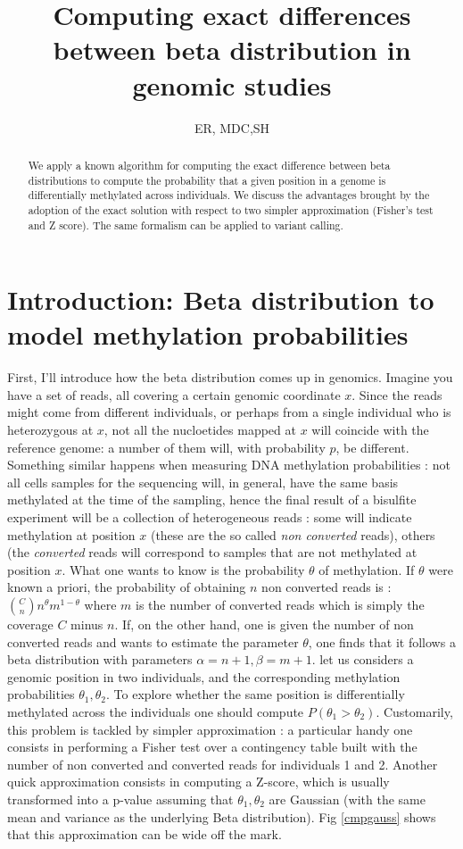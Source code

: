 \documentclass{amsart}
\title{Computing exact differences between beta distribution in genomic studies}
\author{ER, MDC,SH}
\begin{document}
\begin{abstract}
We apply a known algorithm for computing the exact difference between beta distributions
to compute the probability that a given position in a genome is differentially methylated across
individuals. We discuss the advantages brought by the adoption of the exact solution
with respect to two simpler approximation (Fisher's test and Z score).
The same formalism can be applied to variant calling.
\end{abstract}
\maketitle

\section{Introduction: Beta distribution to model methylation probabilities}
First, I'll introduce how the beta distribution comes up in genomics.
Imagine you have a set of reads, all covering a certain genomic coordinate $x$. Since the reads might come from different individuals, or perhaps from a single individual who is heterozygous at $x$, not all the nucloetides mapped at $x$ will coincide with the reference genome: a number of them will, with probability $p$, be different. 
Something similar happens when measuring DNA methylation probabilities : not all cells samples for the sequencing will, in general,  have the same basis methylated at the time of the sampling, hence the final result of a bisulfite experiment will be a collection of heterogeneous reads : some will indicate methylation at position $x$ (these are the so called {\em non converted} reads), others (the {\em converted} reads will correspond to samples that are not methylated at position $x$. What one wants to know is the probability $\theta$ of methylation. If $\theta$ were known a priori, the probability of obtaining $n$ non converted reads is :
${C \choose n}n^\theta m^{1-\theta}$
where $m$ is the number of converted reads which is simply the coverage $C$ minus $n$.
If, on the other hand, one is given the number of non converted reads and wants to
estimate the parameter $\theta$, one finds that it follows a beta distribution with parameters $\alpha=n+1,\beta=m+1$.
let us considers a genomic position in two individuals, and the corresponding methylation probabilities $\theta_1,\theta_2$. To explore whether the same position is differentially methylated across the individuals one
should compute $P(\theta_1>\theta_2)$. Customarily, this problem is tackled by simpler approximation : a particular handy one consists in performing a Fisher test over a contingency table built with the number of non converted and converted reads for individuals 1 and 2. Another quick approximation consists in computing a Z-score, which is usually transformed into a p-value assuming that $\theta_1,\theta_2$ are Gaussian (with the same mean and variance as the underlying Beta distribution).  Fig \ref{cmpgauss} shows that this approximation can be wide off the mark.
\end{document}
